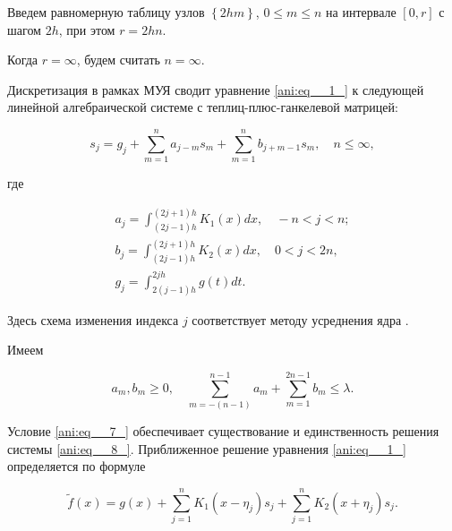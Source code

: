 Введем равномерную таблицу узлов $\left\{2h m\right\}$, $0\le m\le n$ на интервале $\left[0, r\right]$ с шагом $2h$, при этом $r=2hn$. 

Когда $r=\infty$, будем считать $n=\infty$. 

Дискретизация в рамках  МУЯ  сводит уравнение \eqref{ani:eq__1_} к следующей линейной алгебраической системе с теплиц-плюс-ганкелевой матрицей:

\begin{equation} \label{ani:eq__8_}

 s _{j} =g_{j} +\sum\limits _{m=1}^{n} a_{j-m} s _{m} +\sum\limits _{m=1}^{n} b_{j+m-1} s _{m} ,\quad n\le \infty,

 \end{equation}

где

\begin{equation} \label{ani:eq__9_}\begin{array}{l}

\displaystyle a_{j} =\int _{\left(2j-1\right)h}^{\left(2j+1\right)h} K_{1}  (x) dx,\quad -n<j<n;\\[4mm]

\displaystyle b_{j} =\int _{\left(2j-1\right)h}^{\left(2j+1\right)h} K_{2}  (x) dx,\quad 0<j<2n,\\[4mm]

\displaystyle g_{j} =\int _{2\left(j-1\right)h}^{2jh} g (t) dt.

\end{array}\end{equation}

Здесь  схема изменения индекса $j$ соответствует методу усреднения ядра \cite{ani:EnB}.





Имеем

\begin{equation} \label{ani:eq__10_}

 a_{m}, b_{m} \ge 0, \quad  

 \sum\limits _{m=-(n-1)}^{n-1} a_{m} +\sum\limits _{m=1}^{2n-1} b_{m} \le \lambda.  \end{equation}



Условие \eqref{ani:eq__7_}  обеспечивает существование и единственность решения  системы \eqref{ani:eq__8_}. Приближенное решение уравнения \eqref{ani:eq__1_} определяется по формуле

\begin{equation}\label{ani:eq11}

\tilde{f} (x) =g (x) +\sum\limits _{j=1}^{n} K_{1} \left(x-\eta _{j} \right)s _{j}

 +\sum\limits _{j=1}^{n} K_{2} \left(x+\eta _{j} \right)s _{j}.

\end{equation}



